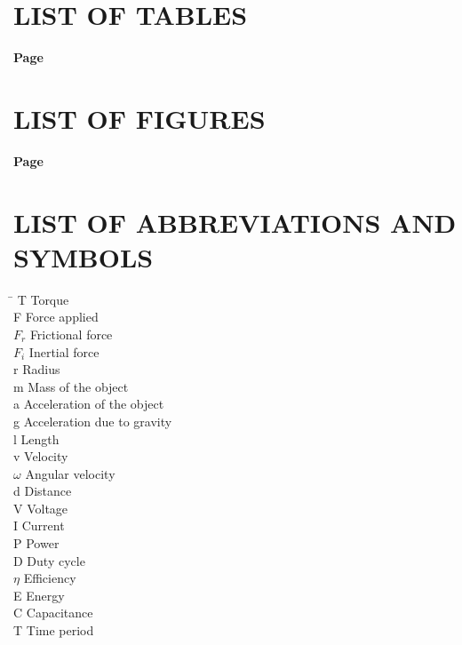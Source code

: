 
\cleardoublepage
\makeatletter
\chapter*{LIST OF TABLES}
\vspace{1.5\baselineskip}
\hfill{\bfseries Page}\par\vspace{.5\baselineskip}
\makeatother
\cleardoublepage

\makeatletter
\chapter*{LIST OF FIGURES}
\vspace{1.5\baselineskip}
\hfill{\bfseries Page}\par\vspace{.5\baselineskip}
\makeatother

\cleardoublepage
\makeatletter
\chapter*{LIST OF ABBREVIATIONS AND SYMBOLS}

\vspace{1.5\baselineskip}
\noindent
\begin{tabbing}
\hspace{2.5cm}\=\kill
T \> Torque \\
F \> Force applied \\
$F_{r}$ \> Frictional force \\
$F_{i}$ \> Inertial force \\
r \> Radius \\
m \> Mass of the object \\
a \> Acceleration of the object \\
g \> Acceleration due to gravity \\
l \> Length \\
v \> Velocity \\
$\omega$ \> Angular velocity \\
d \> Distance \\
V \> Voltage \\
I \> Current \\
P \> Power \\
D \> Duty cycle \\
$\eta$ \> Efficiency \\
E \> Energy \\
C \> Capacitance \\
T \> Time period \\
\end{tabbing}
\makeatother
